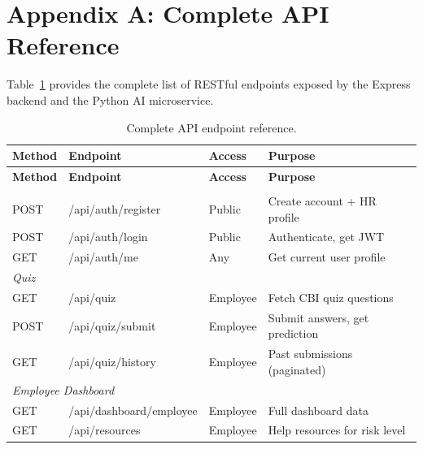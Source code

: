 \documentclass[12pt,a4paper]{article}
\begin{document}
\vspace{1cm}

\section*{Appendix A: Complete API Reference}

Table~\ref{tab:api-full} provides the complete list of RESTful endpoints
exposed by the Express backend and the Python AI microservice.

\begin{longtable}{@{}llll@{}}
  \caption{Complete API endpoint reference.}
  \label{tab:api-full} \\
  \toprule
  \textbf{Method} & \textbf{Endpoint} & \textbf{Access} & \textbf{Purpose} \\
  \midrule
  \endfirsthead
  \toprule
  \textbf{Method} & \textbf{Endpoint} & \textbf{Access} & \textbf{Purpose} \\
  \midrule
  \endhead
  \bottomrule
  \endfoot

  \multicolumn{4}{l}{\textit{Authentication}} \\
  POST   & /api/auth/register     & Public   & Create account + HR profile \\
  POST   & /api/auth/login        & Public   & Authenticate, get JWT \\
  GET    & /api/auth/me           & Any      & Get current user profile \\
  \midrule

  \multicolumn{4}{l}{\textit{Quiz}} \\
  GET    & /api/quiz              & Employee & Fetch CBI quiz questions \\
  POST   & /api/quiz/submit       & Employee & Submit answers, get prediction \\
  GET    & /api/quiz/history      & Employee & Past submissions (paginated) \\
  \midrule

  \multicolumn{4}{l}{\textit{Employee Dashboard}} \\
  GET    & /api/dashboard/employee & Employee & Full dashboard data \\
  GET    & /api/resources         & Employee & Help resources for risk level \\
  \midrule


\end{longtable}
\end{document}
